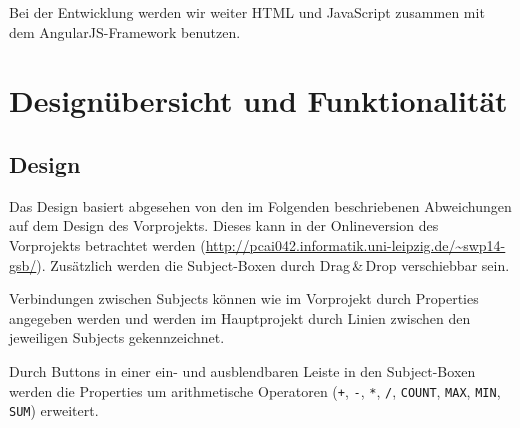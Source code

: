 Bei der Entwicklung werden wir weiter HTML und JavaScript zusammen mit
dem AngularJS-Framework benutzen.

\section{Designübersicht und Funktionalität}
\subsection*{Design}

Das Design basiert abgesehen von den im Folgenden beschriebenen
Abweichungen auf dem Design des Vorprojekts. Dieses kann in der
Onlineversion des Vorprojekts betrachtet werden (\url{http://pcai042.informatik.uni-leipzig.de/~swp14-gsb/}).
Zusätzlich werden die Subject-Boxen durch Drag\,\&\,Drop verschiebbar
sein.

Verbindungen zwischen Subjects können wie im Vorprojekt durch
Properties angegeben werden und werden im Hauptprojekt durch Linien
zwischen den jeweiligen Subjects gekennzeichnet.

Durch Buttons in einer ein- und ausblendbaren Leiste in den
Subject-Boxen werden die Properties um arithmetische Operatoren
(\verb-+-, \verb+-+, \verb+*+, \verb+/+, \verb+COUNT+, \verb+MAX+, \verb+MIN+, \verb+SUM+)
erweitert.

